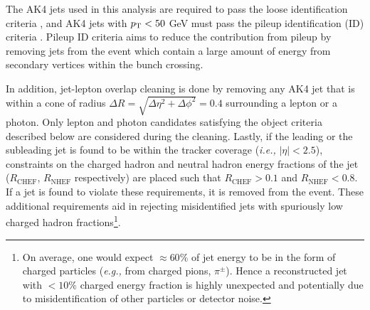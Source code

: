 The AK4 jets used in this analysis are required to pass the 
loose identification criteria \cite{CMS:JME_jetId}, and AK4 jets with $p_{\textrm{T}} < 50$ GeV 
must pass the pileup identification (ID) criteria \cite{CMS:JME_jetPuID}. 
Pileup ID criteria aims to reduce the contribution from
pileup by removing jets from the event which contain a large amount of energy from secondary vertices
within the bunch crossing.



In addition, jet-lepton overlap cleaning is done by removing any AK4 jet that is within a cone of radius
$\Delta R = \sqrt{\Delta \eta^2 + \Delta \phi^2} = 0.4$ surrounding a lepton or a photon. Only lepton and 
photon candidates satisfying the object criteria described below are considered during the cleaning.
Lastly, if the leading or the subleading jet is found to be within the tracker coverage (\textit{i.e.,} $|\eta| < 2.5$),
constraints on the charged hadron and neutral hadron energy fractions of the jet ($R_{\textrm{CHEF}}$, $R_{\textrm{NHEF}}$ respectively) 
are placed such that $R_{\textrm{CHEF}} > 0.1$ and 
$R_{\textrm{NHEF}} < 0.8$. If a jet is found to violate these requirements, it is removed from the event.
These additional requirements aid in rejecting misidentified jets with spuriously low charged hadron 
fractions\footnote{On average, one would expect $\approx 60\%$ of jet energy to be in the form of charged particles
(\textit{e.g.,} from charged pions, $\pi^{\pm}$). Hence a reconstructed jet with $<10 \%$ charged energy fraction is highly unexpected and potentially 
due to misidentification of other particles or detector noise.}.


